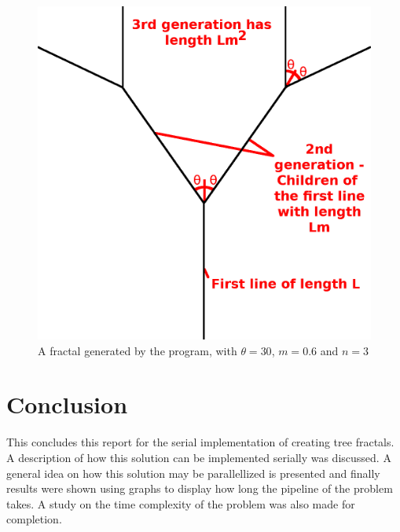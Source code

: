 \documentclass[11pt]{article}
\begin{document}
\begin{figure}
	\label{general explanation}
	\includegraphics[width=\linewidth]{Images/GeneralExplanation.png}
	\centering
	\caption{A fractal generated by the program, with $\theta=30$, $m=0.6$ and $n=3$}
\end{figure}





\section{Conclusion}
This concludes this report for the serial implementation of creating tree fractals. A description of how this solution can be implemented serially was discussed. A general idea on how this solution may be parallellized is presented and finally results were shown using graphs to display how long the pipeline of the problem takes. A study on the time complexity of the problem was also made for completion.

\pagebreak




\pagebreak

%
\end{document}
